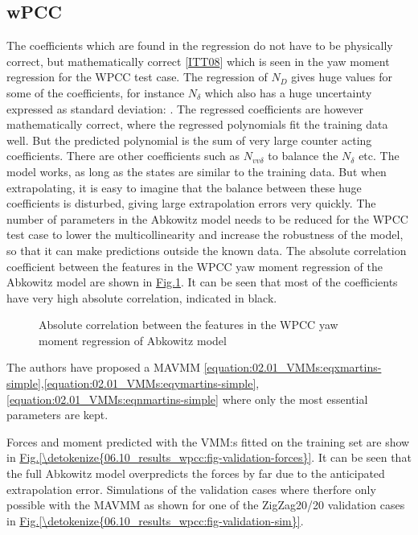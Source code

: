 \documentclass[review]{elsarticle}
\begin{document}
\subsection{wPCC}
\label{\detokenize{06.10_results_wpcc:wpcc}}\label{\detokenize{06.10_results_wpcc::doc}}
\sphinxAtStartPar
The coefficients which are found in the regression do not have to be physically correct, but mathematically correct {[}\hyperlink{cite.bibligraphy:id75}{ITT08}{]} which is seen in the yaw moment regression for the WPCC test case. The regression of \(N_D\) gives huge values for some of the coefficients, for instance \(N_{\delta}\) which also has a huge uncertainty expressed as standard deviation: . The regressed coefficients are however mathematically correct, where the regressed polynomials fit the training data well. But the predicted polynomial is the sum of very large counter acting coefficients. There are other coefficients such as \( N_{vv \delta} \) to balance the \(N_{\delta}\) etc. The model works, as long as the states are similar to the training data. But when extrapolating, it is easy to imagine that the balance between these huge coefficients is disturbed, giving large extrapolation errors very quickly.
The number of parameters in the Abkowitz model needs to be reduced for the WPCC test case to lower the multicollinearity and increase the robustness of the model, so that it can make predictions outside the known data.
The absolute correlation coefficient between the features in the WPCC yaw moment regression of the Abkowitz model are shown in \hyperref[\detokenize{06.10_results_wpcc:fig-ncorr}]{Fig.\@ \ref{\detokenize{06.10_results_wpcc:fig-ncorr}}}. It can be seen that most of the coefficients have very high absolute correlation, indicated in black.

\begin{figure}[H]
\centering
\capstart

\noindent{}
\caption{Absolute correlation between the features in the WPCC yaw moment regression of Abkowitz model}\label{\detokenize{06.10_results_wpcc:fig-ncorr}}\end{figure}

\sphinxAtStartPar
The authors have proposed a MAVMM \autoref{equation:02.01_VMMs:eqxmartins-simple},\autoref{equation:02.01_VMMs:eqymartins-simple}, \autoref{equation:02.01_VMMs:eqnmartins-simple} where only the most essential parameters are kept.

\sphinxAtStartPar
Forces and moment predicted with the VMM:s fitted on the training set are show in \hyperref[\detokenize{06.10_results_wpcc:fig-validation-forces}]{Fig.\@ \ref{\detokenize{06.10_results_wpcc:fig-validation-forces}}}. It can be seen that the full Abkowitz model overpredicts the forces by far due to the anticipated extrapolation error. Simulations of the validation cases where therfore only possible with the MAVMM as shown for one of the ZigZag20/20 validation cases in \hyperref[\detokenize{06.10_results_wpcc:fig-validation-sim}]{Fig.\@ \ref{\detokenize{06.10_results_wpcc:fig-validation-sim}}}.
\end{document}
